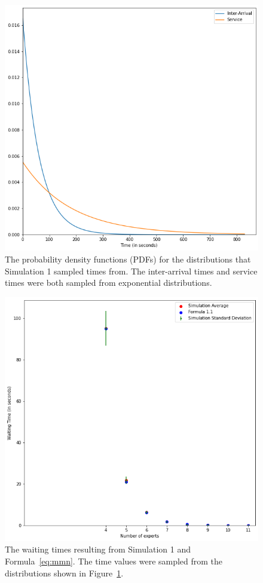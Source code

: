 \begin{figure}[H]
  \includegraphics[width=\textwidth]{figures/montecarlo/expon_expon.png}
  \caption{
    The probability density functions (PDFs) for the distributions that
    Simulation 1 sampled times from.
    The inter-arrival times and service times were both sampled from
    exponential distributions.
  }\label{fig:simple_sim1_dists}
\end{figure}

\begin{figure}[H]
  \includegraphics[width=\textwidth]{figures/montecarlo/independent_calls_expon.png}
  \caption{
    The waiting times resulting from Simulation 1 and Formula~\ref{eq:mmn}.
    The time values were sampled from the distributions shown in
    Figure~\ref{fig:simple_sim1_dists}.
  }\label{fig:simple_sim1_results}
\end{figure}

